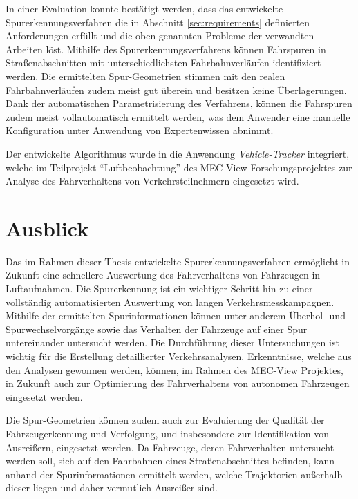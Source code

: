 In einer Evaluation konnte bestätigt werden, dass das entwickelte Spurerkennungsverfahren die in Abschnitt
\ref{sec:requirements} definierten Anforderungen erfüllt und die oben genannten Probleme der verwandten Arbeiten löst.
Mithilfe des Spurerkennungsverfahrens können Fahrspuren in Straßenabschnitten mit unterschiedlichsten
Fahrbahnverläufen identifiziert werden. Die ermittelten Spur-Geometrien stimmen mit den realen Fahrbahnverläufen
zudem meist gut überein und besitzen keine Überlagerungen. Dank der automatischen Parametrisierung des Verfahrens,
können die Fahrspuren zudem meist vollautomatisch ermittelt werden, was dem Anwender eine manuelle Konfiguration
unter Anwendung von Expertenwissen abnimmt.

Der entwickelte Algorithmus wurde in die Anwendung \textit{Vehicle-Tracker} integriert,
welche im Teilprojekt ``Luftbeobachtung'' des MEC-View Forschungsprojektes zur Analyse des Fahrverhaltens
von Verkehrsteilnehmern eingesetzt wird.

\section{Ausblick}

Das im Rahmen dieser Thesis entwickelte Spurerkennungsverfahren ermöglicht in Zukunft eine schnellere Auswertung
des Fahrverhaltens von Fahrzeugen in Luftaufnahmen. Die Spurerkennung ist ein wichtiger Schritt hin zu einer
vollständig automatisierten Auswertung von langen Verkehrsmesskampagnen.
Mithilfe der ermittelten Spurinformationen können
unter anderem Überhol- und Spurwechselvorgänge sowie das Verhalten der Fahrzeuge auf einer Spur
untereinander untersucht werden. Die Durchführung dieser Untersuchungen ist wichtig für die Erstellung
detaillierter Verkehrsanalysen. Erkenntnisse, welche aus den Analysen gewonnen werden, können, im
Rahmen des MEC-View Projektes, in Zukunft auch zur Optimierung des Fahrverhaltens von autonomen
Fahrzeugen eingesetzt werden.

Die Spur-Geometrien können zudem auch zur Evaluierung der Qualität der Fahrzeugerkennung und Verfolgung,
und insbesondere zur Identifikation von Ausreißern, eingesetzt werden.
Da Fahrzeuge, deren Fahrverhalten untersucht werden soll, sich auf den Fahrbahnen eines Straßenabschnittes befinden,
kann anhand der Spurinformationen ermittelt werden, welche Trajektorien außerhalb dieser liegen und
daher vermutlich Ausreißer sind.


